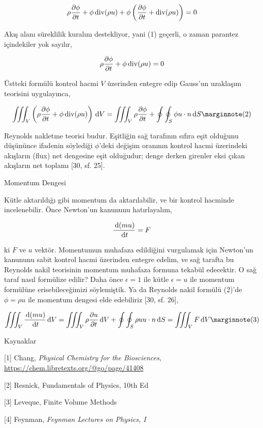 \documentclass[12pt,fleqn]{article}\usepackage{../../common}
\begin{document}
$$
\rho \frac{\partial \phi}{\partial t} +
\phi \operatorname{div} (\rho u ) +
\phi \left(
  \frac{\partial \phi}{\partial t} + \operatorname{div} (\rho u ) 
\right) = 0
$$

Akış alanı süreklilik kuralını destekliyor, yani (1) geçerli, o zaman
parantez içindekiler yok sayılır,

$$
\rho \frac{\partial \phi}{\partial t} + \phi \operatorname{div} (\rho u ) = 0
$$

Üstteki formülü kontrol hacmi $V$ üzerinden entegre edip Gauss'un uzaklaşım
teorisini uygulayınca,

$$
\iiint_V \left(
\rho \frac{\partial \phi}{\partial t} + \phi \bdiv (\rho u )
\right) \ud V =
\iiint_V \rho \frac{\partial \phi}{\partial t} +
\oint \oint_S \phi u \cdot n \ud S
\mlabel{2}
$$

Reynolds nakletme teorisi budur. Eşitliğin sağ tarafının sıfıra eşit olduğunu
düşününce ifadenin söylediği $\phi$'deki değişim oranının kontrol hacmi
üzerindeki akışların (flux) net dengesine eşit olduğudur; denge derken girenler
eksi çıkan akışların net toplamı [30, sf. 25].

Momentum Dengesi

Kütle aktarıldığı gibi momentum da aktarılabilir, ve bir kontrol hacminde
incelenebilir. Önce Newton'un kanununu hatırlayalım,

$$
\frac{\,\mathrm{d} (m u)}{\,\mathrm{d} t} = F
$$

ki $F$ ve $u$ vektör. Momentumun muhafaza edildiğini vurgulamak için Newton'un
kanununu sabit kontrol hacmi üzerinden entegre edelim, ve sağ tarafta bu
Reynolds nakil teorisinin momentum muhafaza formuna tekabül edecektir. O sağ
taraf nasıl formülize edilir? Daha önce $\epsilon = 1$ ile kütle $\epsilon = u$
ile momentum formülüne erisebileceğimizi söylemiştik. Ya da Reynolds nakil
formülü (2)'de $\phi = \rho u$ ile momentum dengesi elde edebiliriz [30, sf. 26],

$$
\iiint_V \frac{\ud (m u)}{\ud t} \ud V =
\iiint_V \rho \frac{\partial u}{\partial t} \ud V +
\oint \oint_S \rho u u \cdot n \ud S =
\iiint_V F \ud V
\mlabel{3}
$$

Kaynaklar

[1] Chang, {\em Physical Chemistry for the Biosciences},
    \url{https://chem.libretexts.org/@go/page/41408}

[2] Resnick, Fundamentals of Physics, 10th Ed

[3] Leveque, Finite Volume Methods

[4] Feynman, {\em Feynman Lectures on Physics, I}
\end{document}
